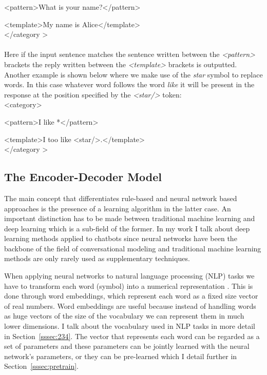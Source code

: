 \documentclass[12pt]{article}
\begin{document}
{\color{OliveGreen}\textless pattern\textgreater}What is your name?{\color{OliveGreen}\textless/pattern\textgreater}

{\color{OliveGreen}\textless template\textgreater}My name is Alice{\color{OliveGreen}\textless/template\textgreater}\\
{\color{OliveGreen}\textless/category \textgreater}\\
\\
Here if the input sentence matches the sentence written between the \textit{\textless pattern\textgreater} brackets the reply written between the \textit{\textless template\textgreater} brackets is outputted.\\
Another example is shown below where we make use of the \textit{star} symbol to replace words. In this case whatever word follows the word \textit{like} it will be present in the response at the position specified by the \textit{\textless star/\textgreater} token:\\
{\color{OliveGreen}\textless category\textgreater}

{\color{OliveGreen}\textless pattern\textgreater}I like *{\color{OliveGreen}\textless/pattern\textgreater}

{\color{OliveGreen}\textless template\textgreater}I too like {\color{OliveGreen}\textless star/\textgreater}.{\color{OliveGreen}\textless/template\textgreater}\\
{\color{OliveGreen}\textless/category \textgreater}\\

\subsection{The Encoder-Decoder Model} \label{ssec:23}
The main concept that differentiates rule-based and neural network based approaches is the presence of a learning algorithm in the latter case. An important distinction has to be made between traditional machine learning and deep learning which is a sub-field of the former. In my work I talk about deep learning methods applied to chatbots since neural networks have been the backbone of the field of conversational modeling and traditional machine learning methods are only rarely used as supplementary techniques.   

When applying neural networks to natural language processing (NLP) tasks we have to transform each word (symbol) into a numerical representation \cite{Bengio:2003}. This is done through word embeddings, which represent each word as a fixed size vector of real numbers. Word embeddings are useful because instead of handling words as huge vectors of the size of the vocabulary we can represent them in much lower dimensions. I talk about the vocabulary used in NLP tasks in more detail in Section~\ref{sssec:234}. The vector that represents each word can be regarded as a set of parameters and these parameters can be jointly learned with the neural network's parameters, or they can be pre-learned which I detail further in Section~\ref{sssec:pretrain}.
\end{document}
